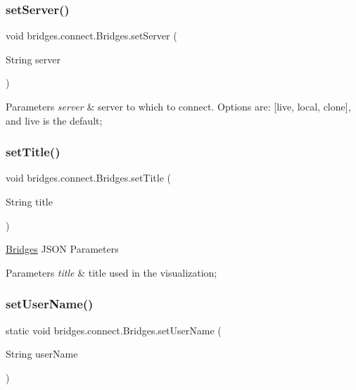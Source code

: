 \subsubsection{\texorpdfstring{set\+Server()}{setServer()}}
{\footnotesize\ttfamily void bridges.\+connect.\+Bridges.\+set\+Server (\begin{DoxyParamCaption}\item[{String}]{server }\end{DoxyParamCaption})}


\begin{DoxyParams}{Parameters}
{\em server} & server to which to connect. Options are\+: \mbox{[}\textquotesingle{}live\textquotesingle{}, \textquotesingle{}local\textquotesingle{}, \textquotesingle{}clone\textquotesingle{}\mbox{]}, and \textquotesingle{}live\textquotesingle{} is the default; \\
\hline
\end{DoxyParams}
\mbox{\label{classbridges_1_1connect_1_1_bridges_aed3752ee6318a48dff271d9a9e2a8fcc}} 
\subsubsection{\texorpdfstring{set\+Title()}{setTitle()}}
{\footnotesize\ttfamily void bridges.\+connect.\+Bridges.\+set\+Title (\begin{DoxyParamCaption}\item[{String}]{title }\end{DoxyParamCaption})}

\mbox{\hyperlink{classbridges_1_1connect_1_1_bridges}{Bridges}} J\+S\+ON Parameters


\begin{DoxyParams}{Parameters}
{\em title} & title used in the visualization; \\
\hline
\end{DoxyParams}
\mbox{\label{classbridges_1_1connect_1_1_bridges_af9b9a2ca03ba02c0c2be4716594678a6}} 
\subsubsection{\texorpdfstring{set\+User\+Name()}{setUserName()}}
{\footnotesize\ttfamily static void bridges.\+connect.\+Bridges.\+set\+User\+Name (\begin{DoxyParamCaption}\item[{String}]{user\+Name }\end{DoxyParamCaption})\hspace{0.3cm}{\ttfamily [static]}}

